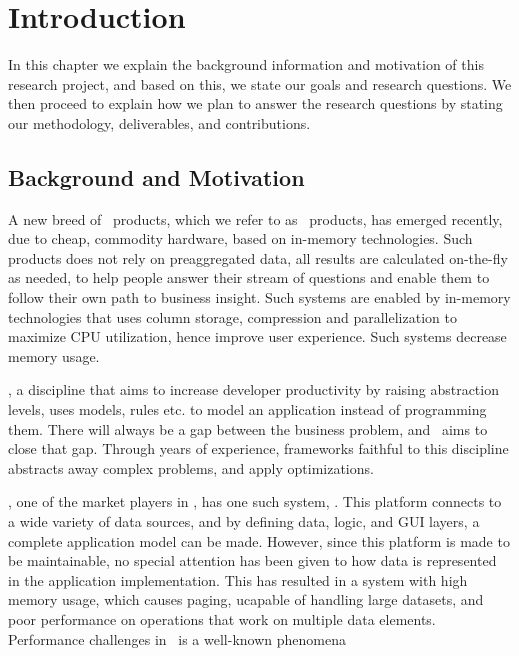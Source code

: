 \chapter{Introduction}
\label{chap:introduction}
In this chapter we explain the background information and motivation of this research project, and based on this, we state our goals and research questions. We then proceed to explain how we plan to answer the research questions by stating our methodology, deliverables, and contributions.
\clearpage

\section{Background and Motivation}
\label{sec:Background and Motivation}
A new breed of \bi~products, which we refer to as \bd~products, has emerged recently, due to cheap, commodity hardware, based on in-memory technologies. Such products does not rely on preaggregated data, all results are calculated on-the-fly as needed, to help people answer their stream of questions and enable them to follow their own path to business insight. Such systems are enabled by in-memory technologies that uses column storage, compression and parallelization to maximize CPU utilization, hence improve user experience. Such systems decrease memory usage. 

\mde, a discipline that aims to increase developer productivity by raising abstraction levels, uses models, rules etc. to model an application instead of programming them. There will always be a gap between the business problem, and \mdd~aims to close that gap. Through years of experience, frameworks faithful to this discipline abstracts away complex problems, and apply optimizations. 

\genus, one of the market players in \mde, has one such system, \gap. This platform connects to a wide variety of data sources, and by defining data, logic, and GUI layers, a complete application model can be made. However, since this platform is made to be maintainable, no special attention has been given to how data is represented in the application implementation. This has resulted in a system with high memory usage, which causes paging, ucapable of handling large datasets, and poor performance on operations that work on multiple data elements. Performance challenges in \mde~is a well-known phenomena \cite{Selic2003-qa} 

